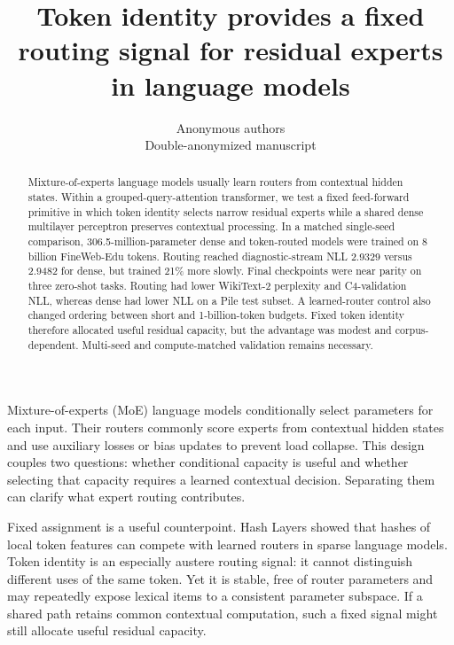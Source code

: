 \documentclass[11pt]{article}
\title{Token identity provides a fixed routing signal for residual experts in language models}
\author{Anonymous authors\\Double-anonymized manuscript}
\date{}
\begin{document}
\maketitle
\linenumbers

\begin{abstract}
Mixture-of-experts language models usually learn routers from contextual hidden states. Within a grouped-query-attention transformer, we test a fixed feed-forward primitive in which token identity selects narrow residual experts while a shared dense multilayer perceptron preserves contextual processing. In a matched single-seed comparison, 306.5-million-parameter dense and token-routed models were trained on 8 billion FineWeb-Edu tokens. Routing reached diagnostic-stream NLL 2.9329 versus 2.9482 for dense, but trained 21\% more slowly. Final checkpoints were near parity on three zero-shot tasks. Routing had lower WikiText-2 perplexity and C4-validation NLL, whereas dense had lower NLL on a Pile test subset. A learned-router control also changed ordering between short and 1-billion-token budgets. Fixed token identity therefore allocated useful residual capacity, but the advantage was modest and corpus-dependent. Multi-seed and compute-matched validation remains necessary.
\end{abstract}

Mixture-of-experts (MoE) language models conditionally select parameters for each input. Their routers commonly score experts from contextual hidden states and use auxiliary losses or bias updates to prevent load collapse\cite{shazeer2017outrageously,fedus2022switch,jiang2024mixtral}. This design couples two questions: whether conditional capacity is useful and whether selecting that capacity requires a learned contextual decision. Separating them can clarify what expert routing contributes.

Fixed assignment is a useful counterpoint. Hash Layers showed that hashes of local token features can compete with learned routers in sparse language models\cite{roller2021hash}. Token identity is an especially austere routing signal: it cannot distinguish different uses of the same token. Yet it is stable, free of router parameters and may repeatedly expose lexical items to a consistent parameter subspace. If a shared path retains common contextual computation, such a fixed signal might still allocate useful residual capacity.
\end{document}

